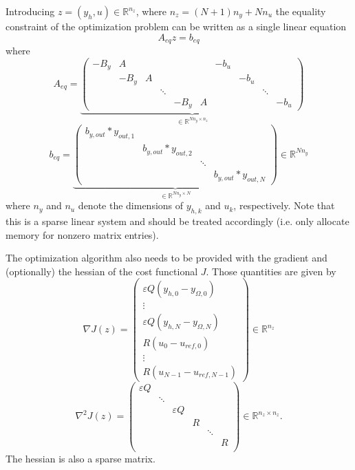 \documentclass[
12pt, %
a4paper, %
onecolumn, %
portrait %
]{article}
\begin{document}
Introducing $z = (y_h, u) \in \mathbb{R}^{n_z}$, where $n_z = (N+1)n_y + N n_u$ the equality constraint of the optimization problem can be written as a single linear equation 
\begin{equation}
A_{eq} z = b_{eq}
\label{eq:linear-system-constraints}
\end{equation}
where
\begin{equation}
A_{eq} =
\underbrace{\begin{pmatrix}
-B_y & A & & & & & -b_u & & \\
& - B_y & A & & & & & -b_u & \\
& & & \ddots & & & & & \ddots \\
& & & & -B_y & A & & & & -b_u
\end{pmatrix}}_{
\in \mathbb{R}^{N n_y \times n_z}}
\end{equation}
\begin{equation}
b_{eq} = 
\underbrace{\begin{pmatrix}
b_{y,out}*y_{out,1} & & & \\
& b_{y,out}*y_{out,2} & &  \\
& & \ddots & \\
& & & b_{y,out}*y_{out,N}
\end{pmatrix}}_{
\in \mathbb{R}^{N n_y \times N}
}
  \in \mathbb{R}^{N n_y}
\end{equation}
where $n_y$ and $n_u$ denote the dimensions of $y_{h,k}$ and $u_k$, respectively.
Note that this is a sparse linear system and should be treated accordingly (i.e. only allocate memory for nonzero matrix entries).

The optimization algorithm also needs to be provided with the gradient and (optionally) the hessian of the cost functional $J$. Those quantities are given by
\begin{equation}
\nabla J(z) = 
\begin{pmatrix}
\varepsilon Q (y_{h,0} - y_{\Omega,0}) \\
\vdots \\
\varepsilon Q (y_{h,N} - y_{\Omega,N}) \\
R (u_0 - u_{ref,0}) \\
\vdots \\
R (u_{N-1} - u_{ref,N-1})
\end{pmatrix} \in \mathbb{R}^{n_z}
\end{equation}
\begin{equation}
\nabla^2 J(z) = 
\begin{pmatrix}
\varepsilon Q & & & & &\\
& \ddots & & & &\\
& & \varepsilon Q & & &\\
& & & R & &\\
& & & & \ddots & \\
& & & & & R \\
\end{pmatrix} \in \mathbb{R}^{n_z \times n_z}.
\end{equation}
The hessian is also a sparse matrix.
\end{document}
